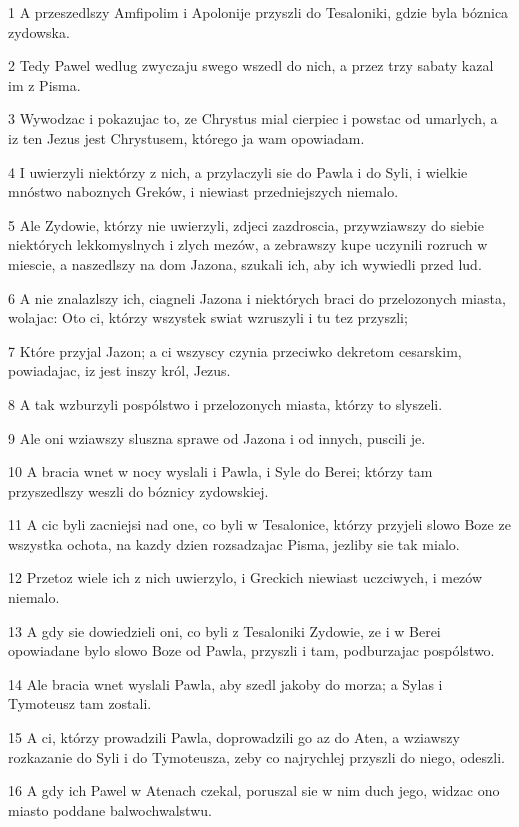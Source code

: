 \par 1 A przeszedlszy Amfipolim i Apolonije przyszli do Tesaloniki, gdzie byla bóznica zydowska.
\par 2 Tedy Pawel wedlug zwyczaju swego wszedl do nich, a przez trzy sabaty kazal im z Pisma.
\par 3 Wywodzac i pokazujac to, ze Chrystus mial cierpiec i powstac od umarlych, a iz ten Jezus jest Chrystusem, którego ja wam opowiadam.
\par 4 I uwierzyli niektórzy z nich, a przylaczyli sie do Pawla i do Syli, i wielkie mnóstwo naboznych Greków, i niewiast przedniejszych niemalo.
\par 5 Ale Zydowie, którzy nie uwierzyli, zdjeci zazdroscia, przywziawszy do siebie niektórych lekkomyslnych i zlych mezów, a zebrawszy kupe uczynili rozruch w miescie, a naszedlszy na dom Jazona, szukali ich, aby ich wywiedli przed lud.
\par 6 A nie znalazlszy ich, ciagneli Jazona i niektórych braci do przelozonych miasta, wolajac: Oto ci, którzy wszystek swiat wzruszyli i tu tez przyszli;
\par 7 Które przyjal Jazon; a ci wszyscy czynia przeciwko dekretom cesarskim, powiadajac, iz jest inszy król, Jezus.
\par 8 A tak wzburzyli pospólstwo i przelozonych miasta, którzy to slyszeli.
\par 9 Ale oni wziawszy sluszna sprawe od Jazona i od innych, puscili je.
\par 10 A bracia wnet w nocy wyslali i Pawla, i Syle do Berei; którzy tam przyszedlszy weszli do bóznicy zydowskiej.
\par 11 A cic byli zacniejsi nad one, co byli w Tesalonice, którzy przyjeli slowo Boze ze wszystka ochota, na kazdy dzien rozsadzajac Pisma, jezliby sie tak mialo.
\par 12 Przetoz wiele ich z nich uwierzylo, i Greckich niewiast uczciwych, i mezów niemalo.
\par 13 A gdy sie dowiedzieli oni, co byli z Tesaloniki Zydowie, ze i w Berei opowiadane bylo slowo Boze od Pawla, przyszli i tam, podburzajac pospólstwo.
\par 14 Ale bracia wnet wyslali Pawla, aby szedl jakoby do morza; a Sylas i Tymoteusz tam zostali.
\par 15 A ci, którzy prowadzili Pawla, doprowadzili go az do Aten, a wziawszy rozkazanie do Syli i do Tymoteusza, zeby co najrychlej przyszli do niego, odeszli.
\par 16 A gdy ich Pawel w Atenach czekal, poruszal sie w nim duch jego, widzac ono miasto poddane balwochwalstwu.
